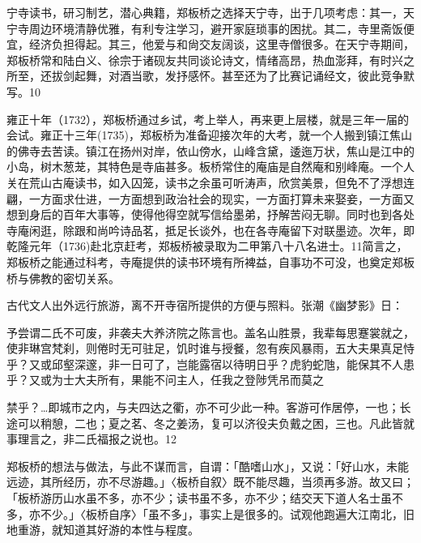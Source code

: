 \noindent 宁寺读书，研习制艺，潜心典籍，郑板桥之选择天宁寺，出于几项考虑：其一，天宁寺周边环境清静优雅，有利专注学习，避开家庭琐事的困扰。其二，寺里斋饭便宜，经济负担得起。其三，他爱与和尙交友阔谈，这里寺僧很多。在天宁寺期间，郑板桥常和陆白义、徐宗于诸砚友共同谈论诗文，情绪高昂，热血澎拜，有时兴之所至，还拔剑起舞，对酒当歌，发抒感怀。甚至还为了比赛记诵经文，彼此竞争默写。10

雍正十年（1732），郑板桥通过乡试，考上举人，再来更上层楼，就是三年一届的会试。雍正十三年(1735)，郑板桥为准备迎接次年的大考，就一个人搬到镇江焦山的佛寺去苦读。镇江在扬州对岸，依山傍水，山峰含黛，逶迤万状，焦山是江中的小岛，树木葱茏，其特色是寺庙甚多。板桥常住的庵庙是自然庵和别峰庵。一个人关在荒山古庵读书，如入囚笼，读书之余虽可听涛声，欣赏美景，但免不了浮想连翩，一方面求仕进，一方面想到政治社会的现实，一方面打算未来娶妾，一方面又想到身后的百年大事等，使得他得空就写信给墨弟，抒解苦闷无聊。同时也到各处寺庵闲逛，除跟和尚吟诗品茗，抵足长谈外，也在各寺庵留下对联墨迹。次年，即乾隆元年（1736)赴北京赶考，郑板桥被录取为二甲第八十八名进士。11简言之，郑板桥之能通过科考，寺庵提供的读书环境有所裨益，自事功不可没，也奠定郑板桥与佛教的密切关系。


古代文人出外远行旅游，离不开寺宿所提供的方便与照料。张潮《幽梦影》日：

\begin{BookQuote}
予尝谓二氏不可废，非袭夫大养济院之陈言也。盖名山胜景，我辈每思蹇裳就之，使非琳宫梵刹，则倦时无可驻足，饥时谁与授餐，忽有疾风暴雨，五大夫果真足恃乎？又或邱壑深邃，非一日可了，岂能露宿以待明日乎？虎豹蛇虺，能保其不人患乎？又或为士大夫所有，果能不问主人，任我之登陟凭吊而莫之
\end{BookQuote}

\vfill
\begin{BookNotes}
\end{BookNotes}

\begin{BookQuote}
禁乎？…即城市之内，与夫四达之衢，亦不可少此一种。客游可作居停，一也；长途可以稍憩，二也；夏之茗、冬之姜汤，复可以济役夫负戴之困，三也。凡此皆就事理言之，非二氏福报之说也。12
\end{BookQuote}

郑板桥的想法与做法，与此不谋而言，自谓：「酷嗜山水」，又说：「好山水，未能远迹，其所经历，亦不尽游趣。」〈板桥自叙〉既不能尽趣，当须再多游。故又曰；「板桥游历山水虽不多，亦不少；读书虽不多，亦不少；结交天下道人名士虽不多，亦不少。」〈板桥自序〉「虽不多」，事实上是很多的。试观他跑遍大江南北，旧地重游，就知道其好游的本性与程度。

